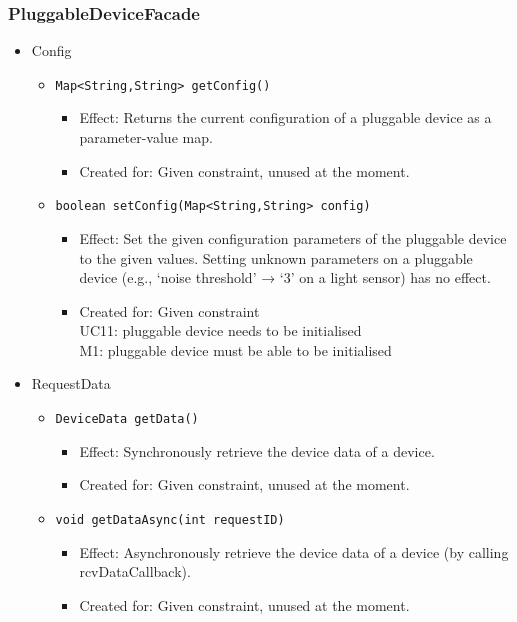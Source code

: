     \subsubsection{PluggableDeviceFacade}
        \begin{itemize}
        	\item Config
        	\begin{itemize}
                \item \texttt{Map<String,String> getConfig()}
                    \begin{itemize}
                        \item Effect: Returns the current configuration of a
                              pluggable device as a parameter-value map.
                        \item Created for: Given constraint, unused at the moment.
                    \end{itemize}
                \item \texttt{boolean setConfig(Map<String,String> config)}
                    \begin{itemize}
                        \item Effect: Set the given configuration parameters of the
                              pluggable device to the given values. Setting unknown parameters
                              on a pluggable device (e.g., ‘noise threshold’ → ‘3’ on a light
                              sensor) has no effect.
                        \item Created for: Given constraint \\
                              UC11: pluggable device needs to be initialised \\
                              M1: pluggable device must be able to be initialised
                    \end{itemize}
        	\end{itemize}

        	\item RequestData
        	\begin{itemize}
                \item \texttt{DeviceData getData()}
                    \begin{itemize}
                        \item Effect: Synchronously retrieve the device data of a device.
                        \item Created for: Given constraint, unused at the moment.
                    \end{itemize}
                \item \texttt{void getDataAsync(int requestID)}
                    \begin{itemize}
                        \item Effect: Asynchronously retrieve the device data
                              of a device (by calling rcvDataCallback).
                        \item Created for: Given constraint, unused at the moment.
                    \end{itemize}
        	\end{itemize}


\end{itemize}
